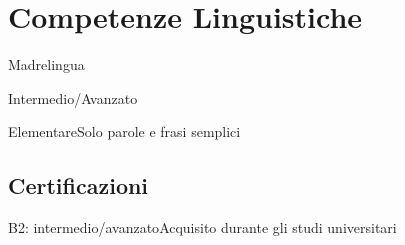%
%
%
%
%
%



\section{Competenze Linguistiche}

{Madrelingua}{}

{Intermedio/Avanzato}{}

{Elementare}{Solo parole e frasi semplici}



\subsection{Certificazioni}

{B2: intermedio/avanzato}{Acquisito durante gli studi universitari}
